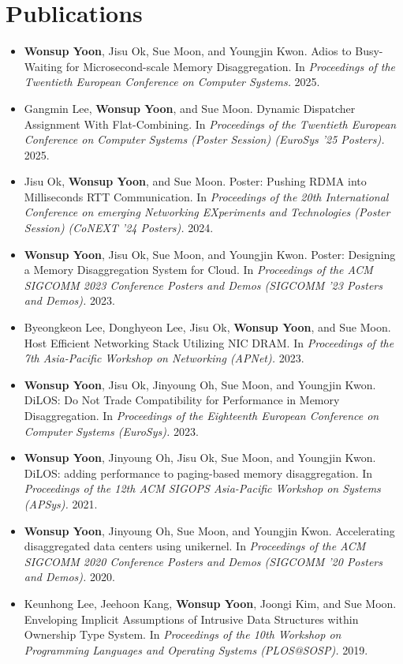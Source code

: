 \documentclass[letterpaper,11pt]{article}
\newcommand{\resumePub}[1]{
  \item\small{#1 \vspace{-2pt}}
}
\newcommand{\resumeSubHeadingListStart}{\begin{itemize}[leftmargin=*]}
\newcommand{\resumeSubHeadingListEnd}{\end{itemize}}
\begin{document}
\section{Publications}
\resumeSubHeadingListStart
\resumePub{\textbf{Wonsup Yoon}, Jisu Ok, Sue Moon, and Youngjin Kwon. Adios to Busy-Waiting for Microsecond-scale Memory Disaggregation. In \textit{Proceedings of the Twentieth European Conference on Computer Systems.} 2025.}
\resumePub{Gangmin Lee, \textbf{Wonsup Yoon}, and Sue Moon. Dynamic Dispatcher Assignment With Flat-Combining. In \textit{Proceedings of the Twentieth European Conference on Computer Systems (Poster Session) (EuroSys '25 Posters).} 2025.}
\resumePub{Jisu Ok, \textbf{Wonsup Yoon}, and Sue Moon. Poster: Pushing RDMA into Milliseconds RTT Communication. In \textit{Proceedings of the 20th International Conference on emerging Networking EXperiments and Technologies (Poster Session) (CoNEXT '24 Posters).} 2024.}
\resumePub{\textbf{Wonsup Yoon}, Jisu Ok, Sue Moon, and Youngjin Kwon. Poster: Designing a Memory Disaggregation System for Cloud. In \textit{Proceedings of the ACM SIGCOMM 2023 Conference Posters and Demos (SIGCOMM '23 Posters and Demos).} 2023.}
\resumePub{Byeongkeon Lee, Donghyeon Lee, Jisu Ok, \textbf{Wonsup Yoon}, and Sue Moon. Host Efficient Networking Stack Utilizing NIC DRAM. In \textit{Proceedings of the 7th Asia-Pacific Workshop on Networking (APNet).} 2023.}
\resumePub{\textbf{Wonsup Yoon}, Jisu Ok, Jinyoung Oh, Sue Moon, and Youngjin Kwon. DiLOS: Do Not Trade Compatibility for Performance in Memory Disaggregation. In \textit{Proceedings of the Eighteenth European Conference on Computer Systems (EuroSys).} 2023.}
\resumePub{\textbf{Wonsup Yoon}, Jinyoung Oh, Jisu Ok, Sue Moon, and Youngjin Kwon. DiLOS: adding performance to paging-based memory disaggregation. In \textit{Proceedings of the 12th ACM SIGOPS Asia-Pacific Workshop on Systems (APSys).} 2021.}
\resumePub{\textbf{Wonsup Yoon}, Jinyoung Oh, Sue Moon, and Youngjin Kwon. Accelerating disaggregated data centers using unikernel. In \textit{Proceedings of the ACM SIGCOMM 2020 Conference Posters and Demos (SIGCOMM '20 Posters and Demos).} 2020.}
\resumePub{Keunhong Lee, Jeehoon Kang, \textbf{Wonsup Yoon}, Joongi Kim, and Sue Moon. Enveloping Implicit Assumptions of Intrusive Data Structures within Ownership Type System. In \textit{Proceedings of the 10th Workshop on Programming Languages and Operating Systems (PLOS@SOSP).} 2019.}
\resumeSubHeadingListEnd
\end{document}
